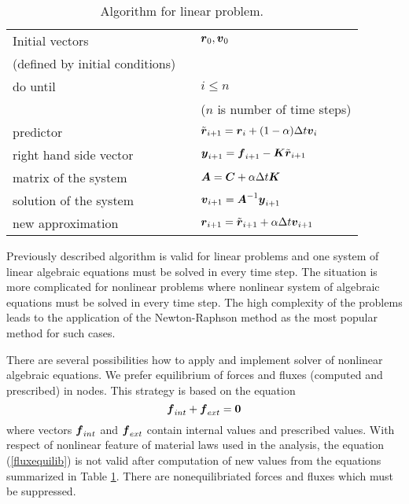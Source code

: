 \begin{table}
\begin{center}
\begin{tabular}{|lll|}
\hline
Initial vectors                 & \hspace{5mm} & $\mbox{\boldmath$r$}_0, \mbox{\boldmath$v$}_0$
\\
(defined by initial conditions) & &
\\[3mm] \hline
do until & & $i \leq n$
\\
 & & ($n$ is number of time steps)
\\[3mm]
predictor & & $\tilde{\mbox{\boldmath$r$}}_{i+1} = \mbox{\boldmath$r$}_i + (1-\alpha)\Delta t \mbox{\boldmath$v$}_i$
\\[3mm]
right hand side vector & & $\mbox{\boldmath$y$}_{i+1} = \mbox{\boldmath$f$}_{i+1} - \mbox{\boldmath$K$}\tilde{\mbox{\boldmath$r$}}_{i+1}$
\\[3mm]
matrix of the system & & $\mbox{\boldmath$A$} = \mbox{\boldmath$C$} + \alpha \Delta t \mbox{\boldmath$K$}$
\\[3mm]
solution of the system & & $\mbox{\boldmath$v$}_{i+1} = \mbox{\boldmath$A$}^{-1} \mbox{\boldmath$y$}_{i+1}$
\\[3mm]
new approximation & & $\mbox{\boldmath$r$}_{i+1} = \tilde{\mbox{\boldmath$r$}}_{i+1} + \alpha \Delta t \mbox{\boldmath$v$}_{i+1}$
\\[3mm] \hline
\end{tabular}
\caption{Algorithm for linear problem.}
\label{linalgtab}
\end{center}
\end{table}

Previously described algorithm is valid for linear problems and one system of linear
algebraic equations must be solved in every time step. The situation is more complicated for
nonlinear problems where nonlinear system of algebraic equations must be solved in every time
step. The high complexity of the problems leads to the application of the Newton-Raphson method
as the most popular method for such cases.

There are several possibilities how to apply and implement solver of nonlinear algebraic
equations. We prefer equilibrium of forces and fluxes (computed and prescribed) in nodes. This strategy is
based on the equation
\begin{equation}\label{fluxequilib}
\mbox{\boldmath$f$}_{int} + \mbox{\boldmath$f$}_{ext} = \mbox{\boldmath$0$}
\end{equation}
where vectors $\mbox{\boldmath$f$}_{int}$ and $\mbox{\boldmath$f$}_{ext}$ contain internal values and prescribed values.
With respect of nonlinear feature of material laws used in
the analysis, the equation (\ref{fluxequilib}) is not valid after computation of new values
from the equations summarized in Table \ref{linalgtab}. There are nonequilibriated forces and fluxes which
must be suppressed.

